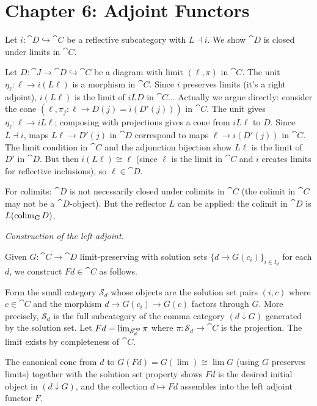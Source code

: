 \section*{Chapter 6: Adjoint Functors}

\begin{exercise}
Let $i: \cat{D} \hookrightarrow \cat{C}$ be a reflective subcategory with $L \dashv i$. We show $\cat{D}$ is closed under limits in $\cat{C}$.

Let $D: \cat{J} \to \cat{D} \hookrightarrow \cat{C}$ be a diagram with limit $(\ell, \pi)$ in $\cat{C}$. The unit $\eta_\ell: \ell \to i(L\ell)$ is a morphism in $\cat{C}$. Since $i$ preserves limits (it's a right adjoint), $i(L\ell)$ is the limit of $iLD$ in $\cat{C}$... Actually we argue directly: consider the cone $(\ell, \pi_j: \ell \to D(j) = i(D'(j)))$ in $\cat{C}$. The unit gives $\eta_\ell: \ell \to iL\ell$; composing with projections gives a cone from $iL\ell$ to $D$. Since $L\dashv i$, maps $L\ell \to D'(j)$ in $\cat{D}$ correspond to maps $\ell \to i(D'(j))$ in $\cat{C}$. The limit condition in $\cat{C}$ and the adjunction bijection show $L\ell$ is the limit of $D'$ in $\cat{D}$. But then $i(L\ell) \cong \ell$ (since $\ell$ is the limit in $\cat{C}$ and $i$ creates limits for reflective inclusions), so $\ell \in \cat{D}$.

For colimits: $\cat{D}$ is not necessarily closed under colimits in $\cat{C}$ (the colimit in $\cat{C}$ may not be a $\cat{D}$-object). But the reflector $L$ can be applied: the colimit in $\cat{D}$ is $L(\operatorname{colim}_{\mathbf{C}} D)$.
\end{exercise}

\begin{exercise}
\textit{Construction of the left adjoint.}

Given $G: \cat{C} \to \cat{D}$ limit-preserving with solution sets $\{d \to G(c_i)\}_{i \in I_d}$ for each $d$, we construct $Fd \in \cat{C}$ as follows.

Form the small category $\mathcal{S}_d$ whose objects are the solution set pairs $(i, c)$ where $c \in \cat{C}$ and the morphism $d \to G(c_i) \to G(c)$ factors through $G$. More precisely, $\mathcal{S}_d$ is the full subcategory of the comma category $(d \downarrow G)$ generated by the solution set. Let $Fd = \lim_{\mathcal{S}_d^{\mathrm{op}}} \pi$ where $\pi: \mathcal{S}_d \to \cat{C}$ is the projection. The limit exists by completeness of $\cat{C}$.

The canonical cone from $d$ to $G(Fd) = G(\lim) \cong \lim G$ (using $G$ preserves limits) together with the solution set property shows $Fd$ is the desired initial object in $(d \downarrow G)$, and the collection $d \mapsto Fd$ assembles into the left adjoint functor $F$.
\end{exercise}

